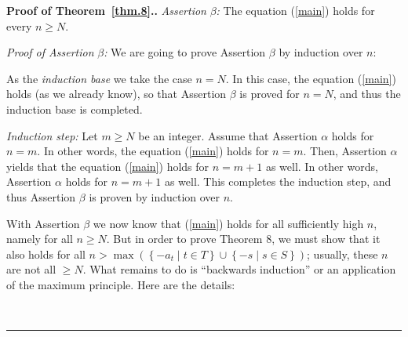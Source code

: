 \documentclass[numbers=enddot,12pt,final,onecolumn,notitlepage]{scrartcl}%
\numberwithin{exer}{section}
\theoremstyle{definition}
\newenvironment{proof}[1][Proof]{\noindent\textbf{#1.} }{\ \rule{0.5em}{0.5em}}
\begin{document}
\begin{proof}[Proof of Theorem~\ref{thm.8}.]
\textit{Assertion }$\beta$\textit{:} The equation (\ref{main}) holds for every
$n\geq N$.

\textit{Proof of Assertion }$\beta$\textit{:} We are going to prove Assertion
$\beta$ by induction over $n$:

As the \textit{induction base} we take the case $n=N$. In this case, the
equation (\ref{main}) holds (as we already know), so that Assertion $\beta$ is
proved for $n=N$, and thus the induction base is completed.

\textit{Induction step:} Let $m\geq N$ be an integer. Assume that Assertion
$\alpha$ holds for $n=m$. In other words, the equation (\ref{main}) holds for
$n=m$. Then, Assertion $\alpha$ yields that the equation (\ref{main}) holds
for $n=m+1$ as well. In other words, Assertion $\alpha$ holds for $n=m+1$ as
well. This completes the induction step, and thus Assertion $\beta$ is proven
by induction over $n$.

With Assertion $\beta$ we now know that (\ref{main}) holds for all
sufficiently high $n$, namely for all $n\geq N$. But in order to prove Theorem
8, we must show that it also holds for all $n>\max\left(  \left\{  -a_{t}\mid
t\in T\right\}  \cup\left\{  -s\mid s\in S\right\}  \right)  $; usually, these
$n$ are not all $\geq N$. What remains to do is ``backwards induction'' or an
application of the maximum principle. Here are the details:


\end{proof}
\end{document}
